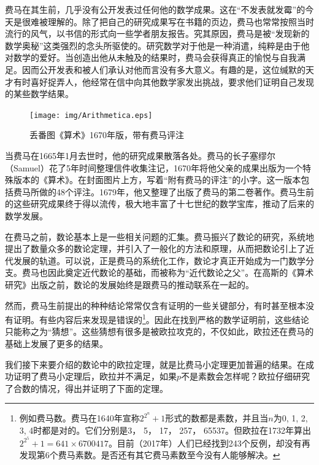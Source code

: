 \documentclass{article}
\begin{document}
费马在其生前，几乎没有公开发表过任何他的数学成果。这在“不发表就发霉”的今天是很难被理解的。除了把自己的研究成果写在书籍的页边，费马也常常按照当时流行的风气，以书信的形式向一些学者朋友报告。究其原因，费马是被“发现新的数学奥秘”这类强烈的念头所驱使的。研究数学对于他是一种消遣，纯粹是由于他对数学的爱好。当创造出他从未触及的结果时，费马会获得真正的愉悦与自我满足。因而公开发表和被人们承认对他而言没有多大意义\cite{HanXueTao2009}。有趣的是，这位缄默的天才有时喜好捉弄人，他经常在信中向其他数学家发出挑战，要求他们证明自己发现的某些数学结果。

\begin{figure}
 \centering
 \texttt{[image: img/Arithmetica.eps]}
 \captionsetup{labelformat=empty}
 \caption{丢番图《算术》1670年版，带有费马评注}
 \label{fig:Arithmetica}
\end{figure}

当费马在1665年1月去世时，他的研究成果散落各处。费马的长子塞缪尔（Samuel）花了5年时间整理信件收集注记，1670年将他父亲的成果出版为一个特殊版本的《算术》。在封面图片上方，写着“附有费马的评注”的小字。这一版本包括费马所做的48个评注。1679年，他又整理了出版了费马的第二卷著作。费马生前的这些研究成果终于得以流传，极大地丰富了十七世纪的数学宝库，推动了后来的数学发展。

在费马之前，数论基本上是一些相关问题的汇集。费马振兴了数论的研究，系统地提出了数量众多的数论定理，并引入了一般化的方法和原理，从而把数论引上了近代发展的轨道。可以说，正是费马的系统化工作，数论才真正开始成为一门数学分支。费马也因此奠定近代数论的基础，而被称为“近代数论之父”。在高斯的《算术研究》出版之前，数论的发展始终是跟费马的推动联系在一起的。

然而，费马生前提出的种种结论常常仅含有证明的一些关键部分，有时甚至根本没有证明。有些内容后来发现是错误的\footnote{例如费马数。费马在1640年宣称$2^{2^n}+1$形式的数都是素数，并且当$n$为0, 1, 2, 3, 4时都是对的。它们分别是3， 5， 17， 257， 65537。但欧拉在1732年算出$2^{2^5} + 1 = 641 \times 6700417$。目前（2017年）人们已经找到243个反例，却没有再发现第6个费马素数。是否还有其它费马素数至今没有人能够解决。}。因此在找到严格的数学证明前，这些结论只能称之为“猜想”。这些猜想有很多是被欧拉攻克的，不仅如此，欧拉还在费马的基础上发展了更多的结果。

我们接下来要介绍的数论中的欧拉定理，就是比费马小定理更加普遍的结果。在成功证明了费马小定理后，欧拉并不满足，如果$p$不是素数会怎样呢？欧拉仔细研究了合数的情况，得出并证明了下面的定理。
\end{document}
